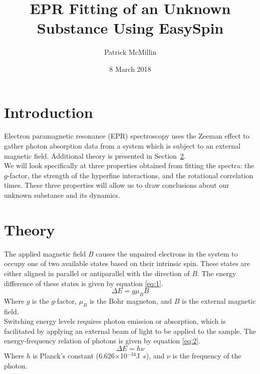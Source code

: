 \documentclass[twocolumn]{article}
\title{EPR Fitting of an Unknown Substance Using EasySpin}
\author{Patrick McMillin}
\affil{Department of Physics and Astronomy, California State University Northridge}
\date{8 March 2018}
\begin{document}
\section{Introduction}
\label{sec:introduction}
Electron paramagnetic resonance (EPR) spectroscopy uses the Zeeman effect to gather photon absorption data from a system which is subject to an external magnetic field. Additional theory is presented in Section~\ref{sec:theory}.\\
\indent
We will look specifically at three properties obtained from fitting the spectra: the $g$-factor, the strength of the hyperfine interactions, and the rotational correlation times. These three properties will allow us to draw conclusions about our unknown substance and its dynamics. 
\section{Theory}
\label{sec:theory}
The applied magnetic field $B$ causes the unpaired electrons in the system to occupy one of two available states based on their intrinsic spin. These states are either aligned in parallel or antiparallel with the direction of $B$. The energy difference of these states is given by equation \ref{eq:1}.
\begin{equation} 
\Delta E = g\mu_BB
\label{eq:1}
\end{equation}
Where $g$ is the $g$-factor, $\mu_B$ is the Bohr magneton, and $B$ is the external magnetic field. \\
Switching energy levels requires photon emission or absorption, which is facilitated by applying an external beam of light to be applied to the sample. The energy-frequency relation of photons is given by equation \ref{eq:2}.
\begin{equation}
\Delta E=h\nu
\label{eq:2}
\end{equation}
Where $h$ is Planck's constant (6.626$\times$10$^{-34}$\si{J.s}), and $\nu$ is the frequency of the photon. \\
\end{document}
